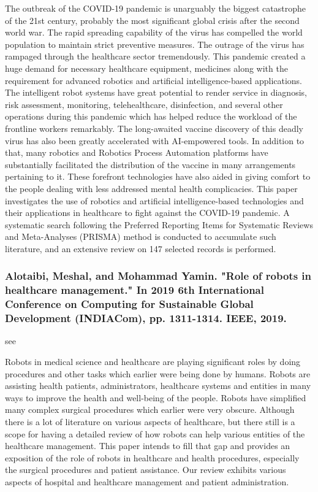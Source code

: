 \documentclass[conference]{IEEEtran}
\begin{document}
The outbreak of the COVID-19 pandemic is unarguably the biggest catastrophe of the 21st century, probably the most significant global crisis after the second world war. The rapid spreading capability of the virus has compelled the world population to maintain strict preventive measures. The outrage of the virus has rampaged through the healthcare sector tremendously. This pandemic created a huge demand for necessary healthcare equipment, medicines along with the requirement for advanced robotics and artificial intelligence-based applications. The intelligent robot systems have great potential to render service in diagnosis, risk assessment, monitoring, telehealthcare, disinfection, and several other operations during this pandemic which has helped reduce the workload of the frontline workers remarkably. The long-awaited vaccine discovery of this deadly virus has also been greatly accelerated with AI-empowered tools. In addition to that, many robotics and Robotics Process Automation platforms have substantially facilitated the distribution of the vaccine in many arrangements pertaining to it. These forefront technologies have also aided in giving comfort to the people dealing with less addressed mental health complicacies. This paper investigates the use of robotics and artificial intelligence-based technologies and their applications in healthcare to fight against the COVID-19 pandemic. A systematic search following the Preferred Reporting Items for Systematic Reviews and Meta-Analyses (PRISMA) method is conducted to accumulate such literature, and an extensive review on 147 selected records is performed.


\medskip
\subsubsection{Alotaibi, Meshal, and Mohammad Yamin. "Role of robots in healthcare management." In 2019 6th International Conference on Computing for Sustainable Global Development (INDIACom), pp. 1311-1314. IEEE, 2019.}
see \cite{alotaibi2019role}

Robots in medical science and healthcare are playing significant roles by doing procedures and other tasks which earlier were being done by humans. Robots are assisting health patients, administrators, healthcare systems and entities in many ways to improve the health and well-being of the people. Robots have simplified many complex surgical procedures which earlier were very obscure. Although there is a lot of literature on various aspects of healthcare, but there still is a scope for having a detailed review of how robots can help various entities of the healthcare management. This paper intends to fill that gap and provides an exposition of the role of robots in healthcare and health procedures, especially the surgical procedures and patient assistance. Our review exhibits various aspects of hospital and healthcare management and patient administration.
\end{document}
